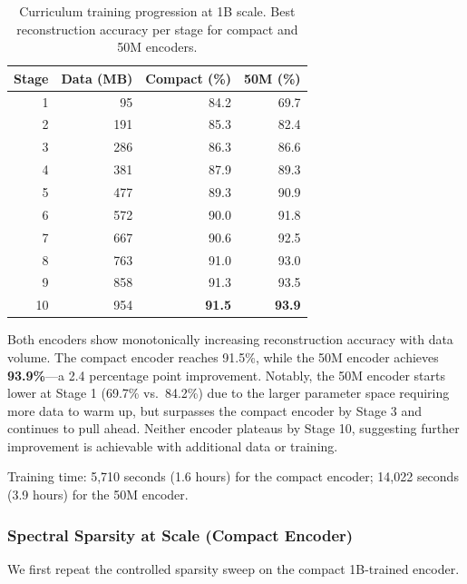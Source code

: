 \documentclass[10pt,twocolumn]{article}
\begin{document}
\begin{table}[t]
\centering
\caption{Curriculum training progression at 1B scale. Best reconstruction accuracy per stage for compact and 50M encoders.}
\label{tab:1b_progression}
\small
\begin{tabular}{@{}rrrr@{}}
\toprule
\textbf{Stage} & \textbf{Data (MB)} & \textbf{Compact (\%)} & \textbf{50M (\%)} \\
\midrule
1  & 95   & 84.2 & 69.7 \\
2  & 191  & 85.3 & 82.4 \\
3  & 286  & 86.3 & 86.6 \\
4  & 381  & 87.9 & 89.3 \\
5  & 477  & 89.3 & 90.9 \\
6  & 572  & 90.0 & 91.8 \\
7  & 667  & 90.6 & 92.5 \\
8  & 763  & 91.0 & 93.0 \\
9  & 858  & 91.3 & 93.5 \\
10 & 954  & \textbf{91.5} & \textbf{93.9} \\
\bottomrule
\end{tabular}
\end{table}

Both encoders show monotonically increasing reconstruction accuracy with data volume. The compact encoder reaches 91.5\%, while the 50M encoder achieves \textbf{93.9\%}---a 2.4 percentage point improvement. Notably, the 50M encoder starts lower at Stage 1 (69.7\% vs.\ 84.2\%) due to the larger parameter space requiring more data to warm up, but surpasses the compact encoder by Stage 3 and continues to pull ahead. Neither encoder plateaus by Stage 10, suggesting further improvement is achievable with additional data or training.

Training time: 5,710 seconds (1.6 hours) for the compact encoder; 14,022 seconds (3.9 hours) for the 50M encoder.

\subsubsection{Spectral Sparsity at Scale (Compact Encoder)}

We first repeat the controlled sparsity sweep on the compact 1B-trained encoder.
\end{document}
